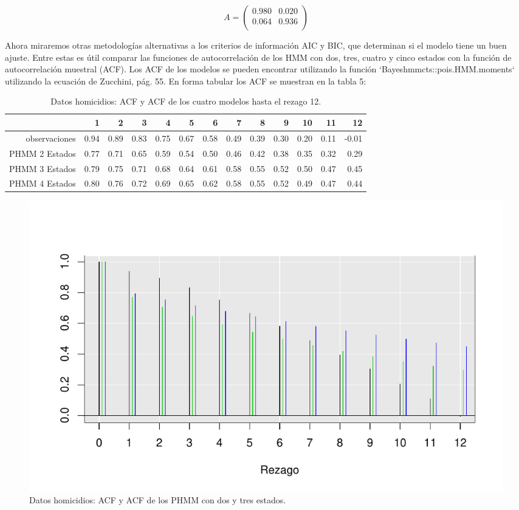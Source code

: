 \documentclass[a4paper]{article}\usepackage[]{graphicx}\usepackage[]{color}
\makeatletter
\def\maxwidth{ %
  \ifdim\Gin@nat@width>\linewidth
    \linewidth
  \else
    \Gin@nat@width
  \fi
}
\newenvironment{knitrout}{}{} %
\makeatother
\begin{document}
$$
A = \begin{pmatrix}{}
  0.980 & 0.020 \\ 
  0.064 & 0.936 \\ 
\end{pmatrix}
$$

Ahora miraremos otras metodologías alternativas a los criterios de información AIC y BIC, que determinan si el modelo tiene un buen ajuste. Entre estas es útil comparar las funciones de autocorrelación de los HMM con dos, tres, cuatro y cinco estados con la función de autocorrelación muestral (ACF). Los ACF de los modelos se pueden encontrar utilizando la función `Bayeshmmcts::pois.HMM.moments` utilizando la ecuación de Zucchini, pág. 55. En forma tabular los ACF se muestran en la tabla 5:

\begin{table}[ht]
\centering
\begin{tabular}{rrrrrrrrrrrrr}
  \hline
 & 1 & 2 & 3 & 4 & 5 & 6 & 7 & 8 & 9 & 10 & 11 & 12 \\ 
  \hline
observaciones & 0.94 & 0.89 & 0.83 & 0.75 & 0.67 & 0.58 & 0.49 & 0.39 & 0.30 & 0.20 & 0.11 & -0.01 \\ 
  PHMM 2 Estados & 0.77 & 0.71 & 0.65 & 0.59 & 0.54 & 0.50 & 0.46 & 0.42 & 0.38 & 0.35 & 0.32 & 0.29 \\ 
  PHMM 3 Estados & 0.79 & 0.75 & 0.71 & 0.68 & 0.64 & 0.61 & 0.58 & 0.55 & 0.52 & 0.50 & 0.47 & 0.45 \\ 
  PHMM 4 Estados & 0.80 & 0.76 & 0.72 & 0.69 & 0.65 & 0.62 & 0.58 & 0.55 & 0.52 & 0.49 & 0.47 & 0.44 \\ 
   \hline
\end{tabular}
\caption{Datos homicidios: ACF y ACF de los cuatro modelos hasta el rezago 12.} 
\end{table}


\begin{knitrout}
\color{fgcolor}\begin{figure}[h]
\includegraphics[width=\maxwidth]{figure/unnamed-chunk-15-1} \caption[Datos homicidios]{Datos homicidios: ACF y ACF de los PHMM con dos y tres estados.}\label{fig:unnamed-chunk-15}
\end{figure}


\end{knitrout}
\end{document}
